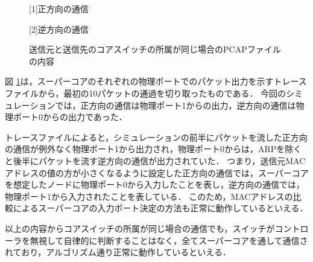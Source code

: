 \begin{figure}[tb]
	\begin{center}
		
		\begin{center}
			\hspace{1.6cm} [1]正方向の通信
		\end{center}
		
		\begin{center}
			\hspace{1.6cm} [2]逆方向の通信
		\end{center}
		\caption{送信元と送信先のコアスイッチの所属が同じ場合のPCAPファイルの内容}
		\label{fig:4-6}
	\end{center}
\end{figure}

図 \ref{fig:4-6}は，スーパーコアのそれぞれの物理ポートでのパケット出力を示すトレースファイルから，最初の10パケットの通過を切り取ったものである．
今回のシミュレーションでは，正方向の通信は物理ポート1からの出力，逆方向の通信は物理ポート0からの出力であった．

トレースファイルによると，シミュレーションの前半にパケットを流した正方向の通信が例外なく物理ポート1から出力され，物理ポート0からは，ARPを除くと後半にパケットを流す逆方向の通信が出力されていた．
つまり，送信元MACアドレスの値の方が小さくなるように設定した正方向の通信では，スーパーコアを想定したノードに物理ポート0から入力したことを表し，逆方向の通信では，物理ポート1から入力されたことを表している．
このため，MACアドレスの比較によるスーパーコアの入力ポート決定の方法も正常に動作しているといえる．

以上の内容からコアスイッチの所属が同じ場合の通信でも，スイッチがコントローラを無視して自律的に判断することはなく，全てスーパーコアを通して通信されており，アルゴリズム通り正常に動作しているといえる．

